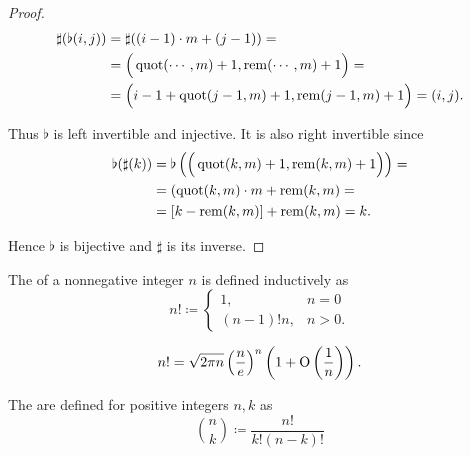 \begin{proof}
  \begin{align*}
    \sharp(\flat(i, j))
    &=
    \sharp((i - 1) \cdot m + (j - 1))
    = \\ &=
    \Big( \operatorname{quot}( \cdots, m) + 1, \operatorname{rem}( \cdots, m) + 1 \Big)
    = \\ &=
    \Big( i - 1 + \operatorname{quot}(j - 1, m) + 1, \operatorname{rem}(j - 1, m) + 1 \Big)
    =
    (i, j).
  \end{align*}

  Thus \( \flat \) is left invertible and injective. It is also right invertible since
  \begin{align*}
    \flat(\sharp(k))
    &=
    \flat\left( \Big( \operatorname{quot}(k, m) + 1, \operatorname{rem}(k, m) + 1 \Big) \right)
    = \\ &=
    (\operatorname{quot}(k, m) \cdot m + \operatorname{rem}(k, m)
    = \\ &=
    [k - \operatorname{rem}(k, m)] + \operatorname{rem}(k, m)
    =
    k.
  \end{align*}

  Hence \( \flat \) is bijective and \( \sharp \) is its inverse.
\end{proof}

\begin{definition}\label{def:factorial}
  The  of a nonnegative integer \( n \) is defined inductively as
  \begin{equation*}
    n! \coloneqq \begin{cases}
      1,          &n = 0 \\
      (n - 1)! n, &n > 0.
    \end{cases}
  \end{equation*}
\end{definition}

\begin{theorem}\label{thm:stirlings_approximation}
  \begin{equation*}
    n! = \sqrt{2 \pi n} \left(\frac n e \right)^n \left(1 + \operatorname{O} \left(\frac 1 n \right) \right).
  \end{equation*}
\end{theorem}

\begin{definition}\label{def:binomial_coefficient}
  The  are defined for positive integers \( n, k \) as
  \begin{equation*}
    \binom n k \coloneqq \frac {n!} {k!(n-k)!}
  \end{equation*}
\end{definition}

